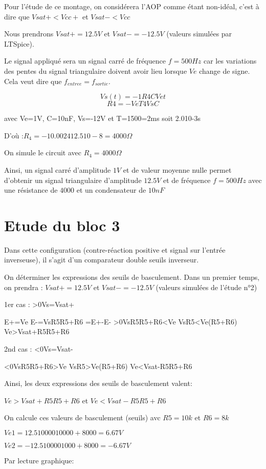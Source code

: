 {Pour l’étude de ce montage, on considérera l’AOP comme étant non-idéal, c’est à dire que $Vsat+<Vcc+$ et $Vsat-<Vcc$

Nous prendrons $Vsat+=12.5V$ et $Vsat-=-12.5V$ (valeurs simulées par LTSpice).

Le signal appliqué sera un signal carré de fréquence $f=500Hz$ car les variations des pentes du signal triangulaire 
doivent avoir lieu lorsque $Ve$ change de signe. Cela veut dire que $f_{entree}=f_{sortie}$.

   $$  Vs(t)=-1R4CVet $$ 
 $$R4=-VeT4VsC $$    

avec Ve=1V, C=10nF, Vs=-12V et T=1500=2ms soit 2.010-3s

D'où :$ R_4=-10.002412.510-8=4000 \Omega$
 
On simule le circuit avec $R_4=4000 \Omega$



Ainsi, un signal carré d’amplitude $1V$ et de valeur moyenne nulle permet d’obtenir un signal triangulaire d'amplitude $12.5V$ et de fréquence $f=500 Hz$ avec une résistance de $4000$ et un condensateur de $10nF$
\section{Etude du bloc 3}


Dans cette configuration (contre-réaction positive et signal sur l’entrée inverseuse), il s’agit d’un comparateur double seuils inverseur.

On déterminer les expressions des seuils de basculement.
Dans un premier temps, on prendra :
 $Vsat+=12.5V$ et $Vsat- =-12.5V$  (valeurs simulées de l’étude n°2)

1er cas : >0Vs=Vsat+

E+=Ve
E-=VsR5R5+R6
=E+-E-
>0VsR5R5+R6<Ve
VsR5<Ve(R5+R6)
Ve>Vsat+R5R5+R6

2nd cas : <0Vs=Vsat-

<0VsR5R5+R6>Ve
VsR5>Ve(R5+R6)
Ve<Vsat-R5R5+R6

Ainsi, les deux expressions des seuils de basculement valent: 

$Ve>Vsat+R5R5+R6$      et        $Ve<Vsat-R5R5+R6$

On calcule ces valeurs de basculement (seuils) avc $R5=10k$ et $R6=8k$

$Ve1=12.51000010000+8000=6.67V$

$Ve2=-12.5100001000+8000=-6.67V$

Par lecture graphique:



}
